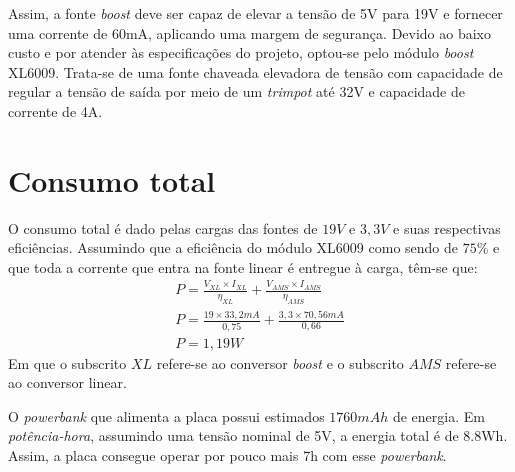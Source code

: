 \documentclass[11pt]{abntex2}
\begin{document}
				Assim, a fonte \textit{boost} deve ser capaz de elevar a tensão
				de 5V para 19V e fornecer uma corrente de 60mA, aplicando uma
				margem de segurança. Devido ao baixo custo e por atender às
				especificações do projeto, optou-se pelo módulo \textit{boost}
				XL6009. Trata-se de uma fonte chaveada elevadora de tensão com
				capacidade de regular a tensão de saída por meio de um
				\textit{trimpot} até 32V e capacidade de corrente de 4A.

			\section{Consumo total}
				O consumo total é dado pelas cargas das fontes de $19V$ e $3,3V$ e
				suas respectivas eficiências. Assumindo que a eficiência do
				módulo XL6009 como sendo de $75\%$ e que toda a corrente que entra
				na fonte linear é entregue à carga, têm-se que:
				\begin{gather*}
					P = \frac{V_{XL}\times I_{XL}}{\eta _{XL}} + \frac{V_{AMS}\times I_{AMS}}{\eta _{AMS}}\\
					P = \frac{19\times 33,2mA}{0,75} + \frac{3,3\times 70,56mA}{0,66}\\
					P = 1,19W
				\end{gather*}
				Em que o subscrito $XL$ refere-se ao conversor \textit{boost} e
				o subscrito $AMS$ refere-se ao conversor linear.

				O \textit{powerbank} que alimenta a placa possui estimados $1760mAh$ de
				energia. Em \textit{potência-hora}, assumindo uma tensão nominal
				de 5V, a energia total é de 8.8Wh. Assim, a placa consegue operar
				por pouco mais 7h com esse \textit{powerbank}.

        
\end{document}
